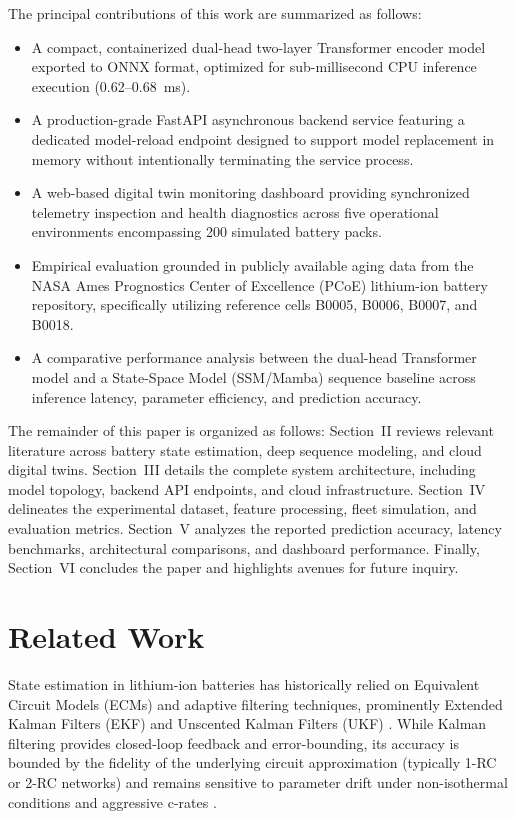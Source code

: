 \documentclass[conference]{IEEEtran}
\begin{document}
The principal contributions of this work are summarized as follows:
\begin{itemize}
    \item A compact, containerized dual-head two-layer Transformer encoder model exported to ONNX format, optimized for sub-millisecond CPU inference execution (0.62--0.68~ms).
    \item A production-grade FastAPI asynchronous backend service featuring a dedicated model-reload endpoint designed to support model replacement in memory without intentionally terminating the service process.
    \item A web-based digital twin monitoring dashboard providing synchronized telemetry inspection and health diagnostics across five operational environments encompassing 200 simulated battery packs.
    \item Empirical evaluation grounded in publicly available aging data from the NASA Ames Prognostics Center of Excellence (PCoE) lithium-ion battery repository, specifically utilizing reference cells B0005, B0006, B0007, and B0018.
    \item A comparative performance analysis between the dual-head Transformer model and a State-Space Model (SSM/Mamba) sequence baseline across inference latency, parameter efficiency, and prediction accuracy.
\end{itemize}

The remainder of this paper is organized as follows: Section~II reviews relevant literature across battery state estimation, deep sequence modeling, and cloud digital twins. Section~III details the complete system architecture, including model topology, backend API endpoints, and cloud infrastructure. Section~IV delineates the experimental dataset, feature processing, fleet simulation, and evaluation metrics. Section~V analyzes the reported prediction accuracy, latency benchmarks, architectural comparisons, and dashboard performance. Finally, Section~VI concludes the paper and highlights avenues for future inquiry.

\section{Related Work}
State estimation in lithium-ion batteries has historically relied on Equivalent Circuit Models (ECMs) and adaptive filtering techniques, prominently Extended Kalman Filters (EKF) and Unscented Kalman Filters (UKF) \cite{Plett2004, He2011}. While Kalman filtering provides closed-loop feedback and error-bounding, its accuracy is bounded by the fidelity of the underlying circuit approximation (typically 1-RC or 2-RC networks) and remains sensitive to parameter drift under non-isothermal conditions and aggressive c-rates \cite{He2011}.
\end{document}
